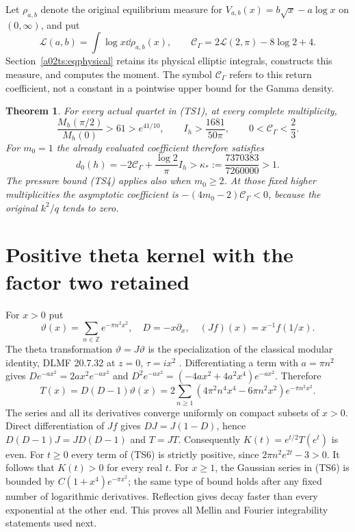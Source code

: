 \documentclass[11pt,a4paper]{article}
\newtheorem{theorem}{Theorem}[section]
\begin{document}
Let $\rho_{a,b}$ denote the original equilibrium measure for
$V_{a,b}(x)=b\sqrt x-a\log x$ on $(0,\infty)$, and put
\begin{equation}\tag{TS3}
 \mathcal L(a,b)=\int\log x\dd\rho_{a,b}(x),\qquad
 \mathcal C_\Gamma=2\mathcal L(2,\pi)-8\log2+4.
\end{equation}
Section~\ref{a02ts:eqphysical} retains its physical elliptic integrals,
constructs this measure, and computes the moment. The symbol
$\mathcal C_\Gamma$ refers to this return coefficient, not a constant
in a pointwise upper bound for the Gamma density.

\begin{theorem}\label{a02ts:th:sign}
For every actual quartet in (TS1), at every complete multiplicity,
\begin{equation}\tag{TS4}
 \frac{M_h(\pi/2)}{M_h(0)}>61>e^{41/10},\qquad
 I_h>\frac{1681}{50\pi},\qquad 0<\mathcal C_\Gamma<\frac23.
\end{equation}
For $m_0=1$ the already evaluated coefficient therefore satisfies
\begin{equation}\tag{TS5}
 d_0(h)=-2\mathcal C_\Gamma+\frac{\log2}{\pi}I_h
 >\kappa_*:=\frac{7370383}{7260000}>1.
\end{equation}
The pressure bound (TS4) applies also when $m_0\geq2$.
At those fixed higher multiplicities the asymptotic coefficient is
$-(4m_0-2)\mathcal C_\Gamma<0$, because the original $k^2/q$ tends to zero.
\end{theorem}

\section{Positive theta kernel with the factor two retained}
For $x>0$ put
\[
 \vartheta(x)=\sum_{n\in\mathbb Z}e^{-\pi n^2x^2},\quad
 D=-x\partial_x,\quad (Jf)(x)=x^{-1}f(1/x).
\]
The theta transformation $\vartheta=J\vartheta$ is the specialization
of the classical modular identity, DLMF 20.7.32 at $z=0$,
$\tau=ix^2$ \cite{a02ts:theta}. Differentiating a term with $a=\pi n^2$
gives $D e^{-ax^2}=2ax^2e^{-ax^2}$ and
$D^2e^{-ax^2}=(-4ax^2+4a^2x^4)e^{-ax^2}$. Therefore
\begin{equation}\tag{TS6}
 T(x)=D(D-1)\vartheta(x)
 =2\sum_{n\geq1}(4\pi^2n^4x^4-6\pi n^2x^2)e^{-\pi n^2x^2}.
\end{equation}
The series and all its derivatives converge uniformly on compact
subsets of $x>0$. Direct differentiation of $Jf$ gives
$DJ=J(1-D)$, hence $D(D-1)J=JD(D-1)$ and $T=JT$.
Consequently $K(t)=e^{t/2}T(e^t)$ is even. For $t\geq0$ every term
of (TS6) is strictly positive, since $2\pi n^2e^{2t}-3>0$.
It follows that $K(t)>0$ for every real $t$. For $x\geq1$, the
Gaussian series in (TS6) is bounded by $C(1+x^4)e^{-\pi x^2}$;
the same type of bound holds after any fixed number of logarithmic
derivatives. Reflection gives decay faster than every exponential
at the other end. This proves all Mellin and Fourier integrability
statements used next.
\end{document}
